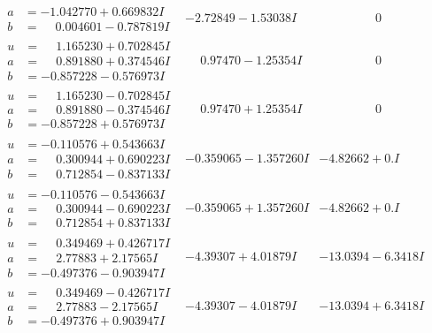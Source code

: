\documentclass[1p]{elsarticle_modified}
\theoremstyle{definition}
\begin{document}
$$\begin{array}{c|c|c}
\begin{aligned}
a &= -1.042770 + 0.669832 I \\
b &= \phantom{-}0.004601 - 0.787819 I\end{aligned}
 & -2.72849 - 1.53038 I & \phantom{-0.000000 } 0 \\ \hline\begin{aligned}
u &= \phantom{-}1.165230 + 0.702845 I \\
a &= \phantom{-}0.891880 + 0.374546 I \\
b &= -0.857228 - 0.576973 I\end{aligned}
 & \phantom{-}0.97470 - 1.25354 I & \phantom{-0.000000 } 0 \\ \hline\begin{aligned}
u &= \phantom{-}1.165230 - 0.702845 I \\
a &= \phantom{-}0.891880 - 0.374546 I \\
b &= -0.857228 + 0.576973 I\end{aligned}
 & \phantom{-}0.97470 + 1.25354 I & \phantom{-0.000000 } 0 \\ \hline\begin{aligned}
u &= -0.110576 + 0.543663 I \\
a &= \phantom{-}0.300944 + 0.690223 I \\
b &= \phantom{-}0.712854 - 0.837133 I\end{aligned}
 & -0.359065 - 1.357260 I & -4.82662 + 0. I\phantom{ +0.000000I} \\ \hline\begin{aligned}
u &= -0.110576 - 0.543663 I \\
a &= \phantom{-}0.300944 - 0.690223 I \\
b &= \phantom{-}0.712854 + 0.837133 I\end{aligned}
 & -0.359065 + 1.357260 I & -4.82662 + 0. I\phantom{ +0.000000I} \\ \hline\begin{aligned}
u &= \phantom{-}0.349469 + 0.426717 I \\
a &= \phantom{-}2.77883 + 2.17565 I \\
b &= -0.497376 - 0.903947 I\end{aligned}
 & -4.39307 + 4.01879 I & -13.0394 - 6.3418 I \\ \hline\begin{aligned}
u &= \phantom{-}0.349469 - 0.426717 I \\
a &= \phantom{-}2.77883 - 2.17565 I \\
b &= -0.497376 + 0.903947 I\end{aligned}
 & -4.39307 - 4.01879 I & -13.0394 + 6.3418 I\\

\end{array}$$
\end{document}
